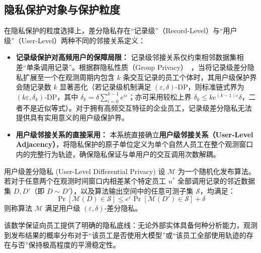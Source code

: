 \subsection{隐私保护对象与保护粒度}
在隐私保护的粒度选择上，差分隐私存在“记录级”（Record-Level）与“用户级”（User-Level）两种不同的邻接关系定义：
\begin{itemize}[leftmargin=2em]
  \item \textbf{记录级保护对高频用户的保障局限：} 记录级邻接关系仅约束相邻数据集相差“单条调用记录”。根据群隐私性质（Group Privacy）~\cite{dwork2014algorithmic}，当将记录级差分隐私扩展至一个在观测周期内包含 $k$ 条交互记录的员工个体时，其用户级保护界会随记录数 $k$ 显著恶化（若记录级机制满足 $(\varepsilon,\delta)$-DP，则标准链式界为 $(k\varepsilon,\delta_k)$-DP，其中 $\delta_k=\delta\sum_{i=0}^{k-1}e^{i\varepsilon}$；亦可采用较松上界 $\delta_k\le k e^{(k-1)\varepsilon}\delta$，二者不是近似等式）。对于拥有高频交互特征的企业员工，记录级差分隐私无法提供具有实用意义的用户级保护界。
  \item \textbf{用户级邻接关系的直接采用：} 本系统直接确立\textbf{用户级邻接关系（User-Level Adjacency）}，将隐私保护的原子单位定义为单个自然人员工在整个观测窗口内的完整行为轨迹，确保隐私保证与单用户的交互调用次数解耦。
\end{itemize}

\begin{definitionbox}{用户级差分隐私 (User-Level Differential Privacy)}
设 $\mathcal{M}$ 为一个随机化发布算法。若对于任意两个在观测时间窗口内相差某个特定员工 $u^*$ 全部调用记录的邻近数据集 $D, D'$（即 $D \sim D'$），以及算法输出空间中的任意可测子集 $\mathcal{S}$，均满足：
\begin{equation}
  \Pr[\mathcal{M}(D) \in \mathcal{S}] \le e^\varepsilon \Pr[\mathcal{M}(D') \in \mathcal{S}] + \delta
\end{equation}
则称算法 $\mathcal{M}$ 满足用户级 $(\varepsilon, \delta)$-差分隐私。
\end{definitionbox}

该数学保证向员工提供了明确的隐私底线：无论外部实体具备何种分析能力，观测到发布结果的概率分布对于“该员工是否使用大模型”或“该员工全部使用轨迹的存在与否”保持极高程度的平滑稳定性。

